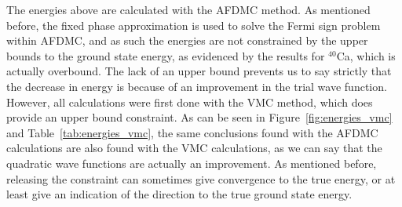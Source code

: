 The energies above are calculated with the AFDMC method. As mentioned before, the fixed phase approximation is used to solve the Fermi sign problem within AFDMC, and as such the energies are not constrained by the upper bounds to the ground state energy, as evidenced by the results for $^{40}$Ca, which is actually overbound. The lack of an upper bound prevents us to say strictly that the decrease in energy is because of an improvement in the trial wave function. However, all calculations were first done with the VMC method, which does provide an upper bound constraint. As can be seen in Figure~\ref{fig:energies_vmc} and Table~\ref{tab:energies_vmc}, the same conclusions found with the AFDMC calculations are also found with the VMC calculations, as we can say that the quadratic wave functions are actually an improvement. As mentioned before, releasing the constraint can sometimes give convergence to the true energy, or at least give an indication of the direction to the true ground state energy.

